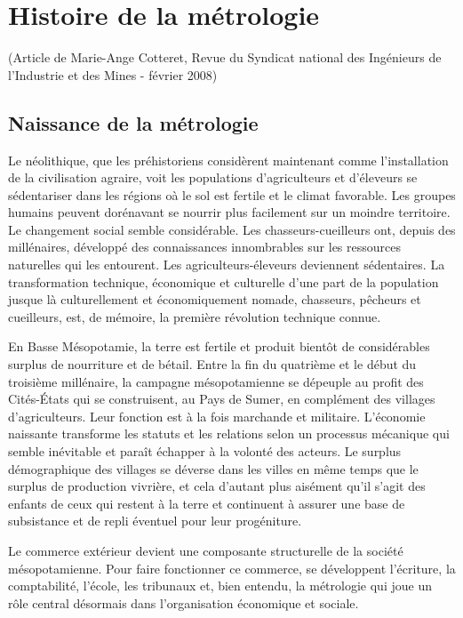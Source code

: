 \chapter{Histoire de la métrologie}

 (Article de Marie-Ange Cotteret, Revue du Syndicat national des Ingénieurs de l'Industrie et des Mines - février 2008)

\sl

\section{Naissance de la métrologie}

Le néolithique, que les préhistoriens considèrent maintenant comme l'installation de la civilisation agraire, voit les populations d'agriculteurs et d'éleveurs se sédentariser dans les régions oà le sol est fertile et le climat favorable. Les groupes humains peuvent dorénavant se nourrir plus facilement sur un moindre territoire.  Le changement social semble considérable. Les chasseurs-cueilleurs ont, depuis des millénaires, développé des connaissances innombrables sur les ressources naturelles qui les entourent. Les agriculteurs-éleveurs deviennent sédentaires.  La transformation technique, économique et culturelle d'une part de la population jusque là culturellement et économiquement nomade, chasseurs, pêcheurs et cueilleurs, est, de mémoire, la première révolution technique connue.

En Basse Mésopotamie, la terre est fertile et produit bientôt de considérables surplus de nourriture et de bétail. Entre la fin du quatrième et le début du troisième millénaire, la campagne mésopotamienne se dépeuple au profit des Cités-États qui se construisent, au Pays de Sumer, en complément des villages d'agriculteurs.  Leur fonction est à la fois marchande et militaire.  L'économie naissante transforme les statuts et les relations selon un processus mécanique qui semble inévitable et paraît échapper à la volonté des acteurs. Le surplus démographique des villages se déverse dans les villes en même temps que le surplus de production vivrière, et cela d'autant plus aisément qu'il s'agit des enfants de ceux qui restent à la terre et continuent à assurer une base de subsistance et de repli éventuel pour leur progéniture.

Le commerce extérieur devient une composante structurelle de la société mésopotamienne. Pour faire fonctionner ce commerce, se développent l'écriture, la comptabilité, l'école, les tribunaux et, bien entendu, la métrologie qui joue un rôle central désormais dans l'organisation économique et sociale.

